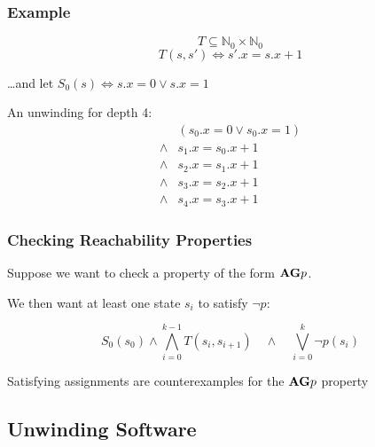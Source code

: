 
\begin{frame}
\frametitle{Example}

\[ T \subseteq \mathds{N}_0 \times \mathds{N}_0 \]
\[ T(s,s') \iff s'.x=s.x+1 \]

\ldots and let $S_0(s)\iff s.x=0 \vee s.x=1$
\vfill
\pause

An unwinding for depth 4:
%
\[\begin{array}{ll}
      & (s_0.x=0  \vee s_0.x=1)\\
\land & s_1.x=s_0.x+1 \\
\land & s_2.x=s_1.x+1 \\
\land & s_3.x=s_2.x+1 \\
\land & s_4.x=s_3.x+1
\end{array}\]

\end{frame}


\begin{frame}
\frametitle{Checking Reachability Properties}

Suppose we want to check a property of the form $\mathrm{\bf A}\mathrm{\bf G} p$.
\vfill
\pause

We then want at \alert{least one state} $s_i$ to satisfy $\neg p$:

\[ S_0(s_0) \land \bigwedge_{i=0}^{k-1} T(s_i,s_{i+1}) \quad\land\quad
\bigvee_{i=0}^k \neg p(s_i)
\]
\vfill

Satisfying assignments are \alert{counterexamples}
for the $\mathrm{\bf A}\mathrm{\bf G} p$ property

\end{frame}


\subsection{Unwinding Software}

